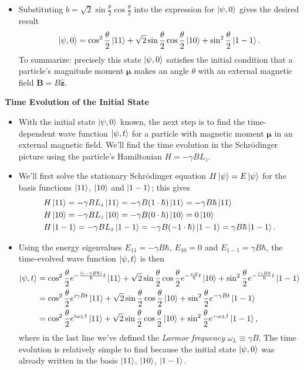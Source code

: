 \documentclass[11pt, a4paper]{article}
\newcommand{\Schro}{Schr\"{o}dinger\xspace}
\renewcommand{\vec}[1]{\bm{#1}} %
\newcommand{\uvec}[1]{\hat{\vec{#1}}} %
\newcommand{\m}{\vec{\mu}}  %
\begin{document}
\begin{itemize}
	\item Substituting $ b = \sqrt{2}\sin \frac{\theta}{2} \cos \frac{\theta}{2} $ into the expression for $ \ket{\psi, 0} $ gives the desired result
	\begin{equation*}
		\ket{\psi, 0} = \cos^{2} \frac{\theta}{2} \ket{11} + \sqrt{2}\sin \frac{\theta}{2} \cos \frac{\theta}{2} \ket{10} + \sin^{2}\frac{\theta}{2} \ket{1 -1}.
	\end{equation*}
	To summarize: precisely this state $ \ket{\psi, 0} $ satisfies the initial condition that a particle's magnitude moment $ \m $ makes an angle $ \theta $ with an external magnetic field $ \vec{B} = B \uvec{z} $. 
\end{itemize}

\textbf{Time Evolution of the Initial State}
\begin{itemize}
	\item With the initial state $ \ket{\psi, 0} $ known, the next step is to find the time-dependent wave function $ \ket{\psi, t} $ for a particle with magnetic moment $ \m $ in an external magnetic field. We'll find the time evolution in the \Schro picture using the particle's Hamiltonian $ H = -\gamma BL_{z}  $. 
	
	\item We'll first solve the stationary \Schro equation $ H \ket{\psi} = E \ket{\psi} $ for the basis functions $ \ket{11} $, $ \ket{10} $ and $ \ket{1-1} $; this gives
	\begin{align*}
		&H \ket{11} = - \gamma BL_{z}\ket{11} = -\gamma B (1\cdot \hbar) \ket{11} = -\gamma B \hbar \ket{11}\\
		&H\ket{10} = - \gamma BL_{z}\ket{10} = -\gamma B (0\cdot \hbar) \ket{10} = 0 \ket{10}\\
		&H \ket{1-1} = - \gamma BL_{z}\ket{1-1} = -\gamma B (-1\cdot \hbar) \ket{1-1} = \gamma B \hbar \ket{1-1}.
	\end{align*}
	
	\item Using the energy eigenvalues $ E_{11} = -\gamma B \hbar $, $ E_{10} = 0 $ and $ E_{1-1} = \gamma B \hbar $, the time-evolved wave function $ \ket{\psi, t} $ is then
	\begin{align*}
		\ket{\psi, t} &= \cos^{2} \frac{\theta}{2} e^{-\frac{i(-\gamma B\hbar)}{\hbar}t}\ket{11} + \sqrt{2}\sin \frac{\theta}{2} \cos \frac{\theta}{2} e^{-\frac{i\cdot 0}{\hbar}t}\ket{10} + \sin^{2}\frac{\theta}{2} e^{-\frac{i\gamma B\hbar}{\hbar}t}\ket{1 -1}\\
		&=\cos^{2} \frac{\theta}{2} e^{i\gamma B t}\ket{11} + \sqrt{2}\sin \frac{\theta}{2} \cos \frac{\theta}{2} \ket{10} + \sin^{2}\frac{\theta}{2} e^{-\gamma B t}\ket{1 -1}\\
		&=\cos^{2} \frac{\theta}{2} e^{i \omega_{L} t}\ket{11} + \sqrt{2}\sin \frac{\theta}{2} \cos \frac{\theta}{2} \ket{10} + \sin^{2}\frac{\theta}{2} e^{-\omega_{L} t}\ket{1 -1},
	\end{align*}
	where in the last line we've defined the \textit{Larmor frequency} $ \omega_{L} \equiv \gamma B $. 	The time evolution is relatively simple to find because the initial state $ \ket{\psi, 0} $ was already written in the basis $ \ket{11} $, $ \ket{10} $, $ \ket{1-1} $. 
	

\end{itemize}
\end{document}
